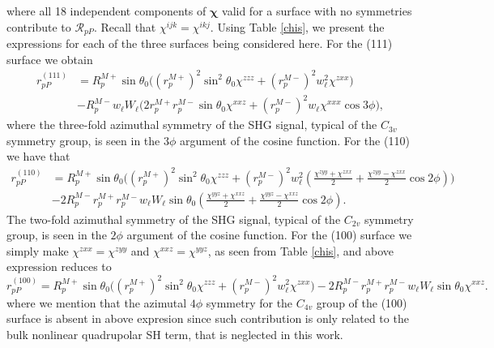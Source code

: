 where all 18 independent components of $\boldsymbol{\chi}$ valid for a surface with no symmetries contribute to $\mathcal{R}_{pP}$. Recall that $\chi^{ijk}=\chi^{ikj}$. Using Table \ref{chis}, we present the expressions for each of the three surfaces being considered here. For the (111) surface we obtain
\begin{equation}\label{rpp111}
\begin{split}
r^{(111)}_{pP} &= 
R^{M+}_{p}\sin\theta_{0}
\Big(
  \left(r^{M+}_{p}\right)^{2}\sin^{2}\theta_{0}\chi^{zzz}
+ \left(r^{M-}_{p}\right)^{2}w^{2}_{\ell}\chi^{zxx}
\Big)\\
&- R^{M-}_{p}w_{\ell}W_{\ell}
\Big(
  2r^{M+}_{p}r^{M-}_{p}\sin\theta_{0}\chi^{xxz}
+ \left(r^{M-}_{p}\right)^{2}w_{\ell}\chi^{xxx}\cos3\phi
\Big),
\end{split}
\end{equation}
where the three-fold azimuthal symmetry of the SHG signal, typical of the $C_{3v}$ symmetry group, is seen in the $3\phi$ argument of the cosine function. For the (110) we have that
\begin{equation}\label{eq:final-rpp.mr.110}
\begin{split}
r^{(110)}_{pP} &= 
R^{M+}_{p}\sin\theta_{0}
\bigg(
  \left(r^{M+}_{p}\right)^{2}\sin^{2}\theta_{0}\chi^{zzz}
+ \left(r^{M-}_{p}\right)^{2}w^{2}_{\ell}
\left(
\frac{\chi^{zyy} + \chi^{zxx}}{2} + \frac{\chi^{zyy} - \chi^{zxx}}{2}\cos2\phi 
\right) 
\bigg)\\
&- 2R^{M-}_{p}r^{M+}_{p}r^{M-}_{p}w_{\ell}W_{\ell}\sin\theta_{0}
\left(
\frac{\chi^{yyz} + \chi^{xxz}}{2} + \frac{\chi^{yyz} - \chi^{xxz}}{2}\cos2\phi 
\right). 
\end{split}
\end{equation}
The two-fold azimuthal symmetry of the SHG signal, typical of the $C_{2v}$ symmetry group, is seen in the $2\phi$ argument of the cosine function. For the (100) surface we simply make $\chi^{zxx}=\chi^{zyy}$ and $\chi^{xxz}=\chi^{yyz}$, as seen from Table \ref{chis}, and above expression reduces to
\begin{equation}\label{rpp100}
r^{(100)}_{pP} = 
R^{M+}_{p}\sin\theta_{0}
\bigg(
  \left(r^{M+}_{p}\right)^{2}\sin^{2}\theta_{0}\chi^{zzz}
+ \left(r^{M-}_{p}\right)^{2}w^{2}_{\ell}\chi^{zxx}
\bigg)
-
2R^{M-}_{p}r^{M+}_{p}r^{M-}_{p}w_{\ell}W_{\ell}\sin\theta_{0}\chi^{xxz}
.
\end{equation}
where we mention that the azimutal $4\phi$ symmetry for the $C_{4v}$ group of the (100) surface is absent in above expresion since such contribution is only related to the bulk nonlinear quadrupolar SH term,\cite{sipePRB87} that is neglected in this work.


